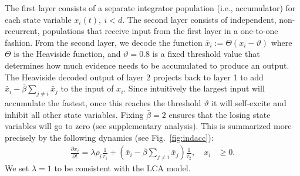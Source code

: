 \documentclass[10pt,letterpaper]{article}
\begin{document}
The first layer consists of a separate integrator population (i.e., accumulator) for each state variable $x_i(t), \ i < d$.
The second layer consists of independent, non-recurrent, populations that receive input from the first layer in a one-to-one fashion.
From the second layer, we decode the function $\bar{x}_i := \Theta(x_i - \vartheta)$ where $\Theta$ is the Heaviside function, and $\vartheta = 0.8$ is a fixed threshold value that determines how much evidence needs to be accumulated to produce an output.
The Heaviside decoded output of layer 2 projects back to layer 1 to add $\bar{x}_i - \bar{\beta} \sum_{j \neq i} \bar{x}_j$ to the input of $x_i$.
Since intuitively the largest input will accumulate the fastest, once this reaches the threshold $\vartheta$ it will self-excite and inhibit all other state variables.
Fixing $\bar{\beta} = 2$ ensures that the losing state variables will go to zero (see supplementary analysis).
This is summarized more precisely by the following dynamics (see Fig.~\ref{fig:indacc}):
\begin{equation}
    \begin{split}
        \frac{{\partial x}_i}{\partial t} = \lambda \rho_i \frac{1}{\tau_1} + \left( 
            \bar{x}_i - \bar{\beta} \sum_{j \neq i} \bar{x}_j \right) \frac{1}{\tau_2} , \quad x_i &\ge 0 .
    \end{split}
\end{equation}
We set $\lambda = 1$ to be consistent with the LCA model.
\end{document}
